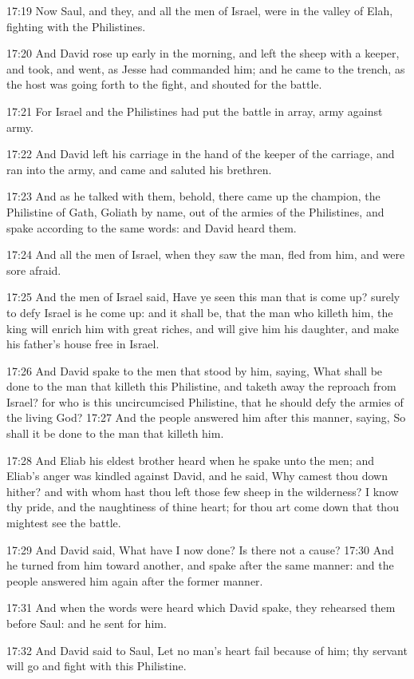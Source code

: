 17:19 Now Saul, and they, and all the men of Israel, were in the valley of Elah, fighting with the Philistines.

17:20 And David rose up early in the morning, and left the sheep with a keeper, and took, and went, as Jesse had commanded him; and he came to the trench, as the host was going forth to the fight, and shouted for the battle.

17:21 For Israel and the Philistines had put the battle in array, army against army.

17:22 And David left his carriage in the hand of the keeper of the carriage, and ran into the army, and came and saluted his brethren.

17:23 And as he talked with them, behold, there came up the champion, the Philistine of Gath, Goliath by name, out of the armies of the Philistines, and spake according to the same words: and David heard them.

17:24 And all the men of Israel, when they saw the man, fled from him, and were sore afraid.

17:25 And the men of Israel said, Have ye seen this man that is come up?  surely to defy Israel is he come up: and it shall be, that the man who killeth him, the king will enrich him with great riches, and will give him his daughter, and make his father's house free in Israel.

17:26 And David spake to the men that stood by him, saying, What shall be done to the man that killeth this Philistine, and taketh away the reproach from Israel? for who is this uncircumcised Philistine, that he should defy the armies of the living God?  17:27 And the people answered him after this manner, saying, So shall it be done to the man that killeth him.

17:28 And Eliab his eldest brother heard when he spake unto the men; and Eliab's anger was kindled against David, and he said, Why camest thou down hither? and with whom hast thou left those few sheep in the wilderness? I know thy pride, and the naughtiness of thine heart; for thou art come down that thou mightest see the battle.

17:29 And David said, What have I now done? Is there not a cause?  17:30 And he turned from him toward another, and spake after the same manner: and the people answered him again after the former manner.

17:31 And when the words were heard which David spake, they rehearsed them before Saul: and he sent for him.

17:32 And David said to Saul, Let no man's heart fail because of him; thy servant will go and fight with this Philistine.

